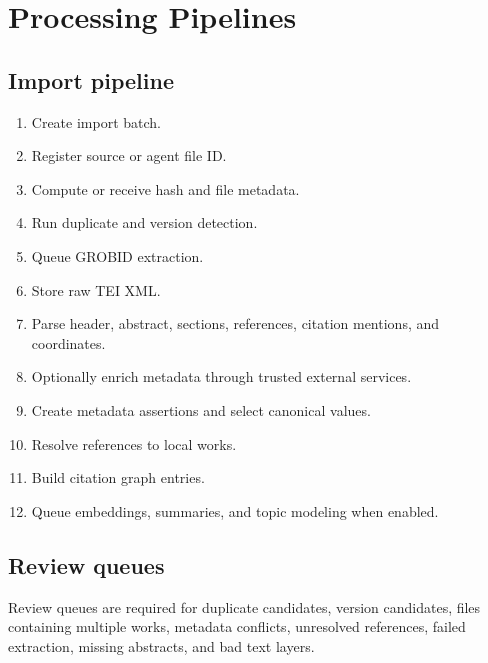\section{Processing Pipelines}

\subsection{Import pipeline}

\begin{enumerate}[noitemsep]
  \item Create import batch.
  \item Register source or agent file ID.
  \item Compute or receive hash and file metadata.
  \item Run duplicate and version detection.
  \item Queue GROBID extraction.
  \item Store raw TEI XML.
  \item Parse header, abstract, sections, references, citation mentions, and coordinates.
  \item Optionally enrich metadata through trusted external services.
  \item Create metadata assertions and select canonical values.
  \item Resolve references to local works.
  \item Build citation graph entries.
  \item Queue embeddings, summaries, and topic modeling when enabled.
\end{enumerate}

\subsection{Review queues}

Review queues are required for duplicate candidates, version candidates, files containing multiple works, metadata conflicts, unresolved references, failed extraction, missing abstracts, and bad text layers.
